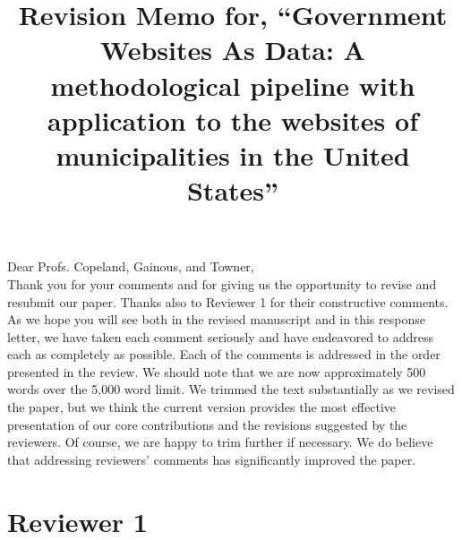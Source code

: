 \documentclass[12pt,titlepage]{article}
\title{Revision Memo for, ``Government Websites As Data: A methodological pipeline with application to the websites of municipalities in the United States''}
\begin{document}
\maketitle

Dear Profs. Copeland, Gainous, and Towner,\\

Thank you for your comments and for giving us the opportunity to revise and resubmit our paper. Thanks also to Reviewer 1 for their constructive comments. As we hope you will see both in the revised manuscript and in this response letter, we have taken each comment seriously and have endeavored to address each as completely as possible. Each of the comments is addressed in the order presented in the review.  We should note that we are now approximately 500 words over the 5,000 word limit. We trimmed the text substantially as we revised the paper, but we think the current version provides the most effective presentation of our core contributions and the revisions suggested by the reviewers. Of course, we are happy to trim further if necessary.  We do believe that addressing reviewers' comments has significantly improved the paper. \\

\section*{Reviewer 1}
\end{document}
